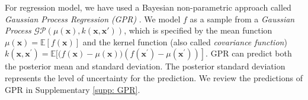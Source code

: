 For regression model, we have used a Bayesian non-parametric approach called \textit{Gaussian Process Regression (GPR)} \cite{Rasmussen2004,srinivas2012information, romero_navigating_2013}.
We model $f$ as a sample from a \textit{Gaussian Process} $\mathcal{G} \mathcal{P}(\mu(\mathbf{x}), k(\mathbf{x}, \mathbf{x'}))$, which is specified by the mean function $\mu(\mathbf{x})=\mathbb{E}[f(\mathbf{x})]$ and the kernel function (also called \textit{covariance function}) $k\left(\mathbf{x}, \mathbf{x}^{\prime}\right)=\mathbb{E}[(f(\mathbf{x})-\left.\mu(\mathbf{x}))\left(f\left(\mathbf{x}^{\prime}\right)-\mu\left(\mathbf{x}^{\prime}\right)\right)\right]$.
GPR can predict both the posterior mean and standard deviation. The posterior standard deviation represents the level of uncertainty for the prediction. 
We review the predictions of GPR in Supplementary \ref{supp: GPR}.


